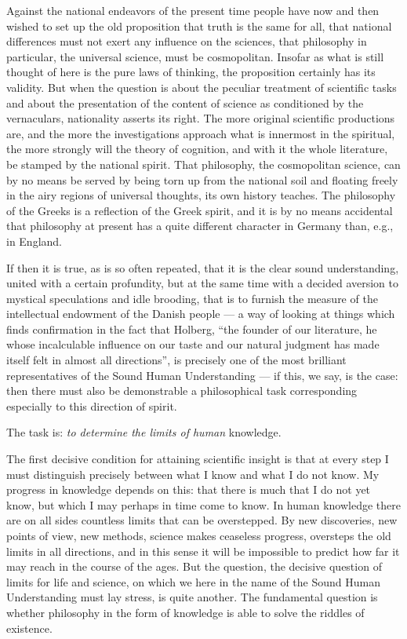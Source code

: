 \documentclass[12pt,a4paper,openany]{book}
\newcommand{\opage}[1]{\marginnote{\footnotesize\textit{[#1]}}}
\begin{document}
Against the national endeavors of the present time
people have now and then wished to set up the old proposition that truth
is the same for all, that national differences must
not exert any influence on the sciences, that philosophy
in particular, the universal science, must be cosmopolitan.
Insofar as what is still thought of here is the pure laws
of thinking, the proposition certainly has its validity.
But when the question is about the peculiar treatment
of scientific tasks and about the presentation of the content of science
as conditioned by the vernaculars,
nationality asserts its right. The more original
scientific productions are, and the
more the investigations approach what is innermost in the spiritual,
the more strongly will the theory of cognition, and with it the whole
literature, be stamped by the national spirit. That philosophy,
the cosmopolitan science, can by no means be
served by being torn up from the national soil and
floating freely in the airy regions of universal thoughts, its
own history teaches. The philosophy of the Greeks is a reflection of
the Greek spirit, and it is by no means accidental that
\setcounter{footnote}{0}%
\opage{388}philosophy at present has a quite different character in
Germany than, e.g., in England.

If then it is true, as is so often repeated,
that it is the clear sound understanding, united with a certain
profundity, but at the same time with a decided aversion to mystical
speculations and idle brooding, that is to
furnish the measure of the intellectual endowment of the Danish people
--- a way of looking at things which finds confirmation in the
fact that Holberg, ``the founder of our literature,
he whose incalculable influence on our taste and our
natural judgment has made itself felt in almost
all directions'', is precisely one of the most
brilliant representatives of the Sound Human Understanding --- if this, we say,
is the case: then there must also be demonstrable
a philosophical task corresponding especially to this direction of spirit.

The task is: \emph{to determine the limits of human}
knowledge.

The first decisive condition for attaining scientific
insight is that at every step I must distinguish precisely
between what I know and what I do not
know. My progress in knowledge depends on this: that there
is much that I do not yet know, but which I may
perhaps in time come to know. In human
knowledge there are on all sides countless limits that
can be overstepped. By new discoveries, new points of view,
new methods, science makes ceaseless progress,
oversteps the old limits in all directions,
and in this sense it will be impossible to predict
how far it may reach in the course of the ages. But the question,
the decisive
\setcounter{footnote}{0}%
\opage{389}question of limits for life and science, on which we here in the name of the Sound Human Understanding
must lay stress, is quite another.
The fundamental question is whether philosophy in the form of knowledge is able
to solve the riddles of existence.
\end{document}
